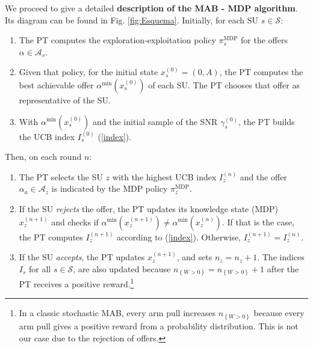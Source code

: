 We proceed to give a detailed \textbf{description of the MAB - MDP algorithm}. Its diagram can be found in Fig. \ref{fig:Esquema}. Initially, for each SU $s \in \mathcal{S}$:
\begin{enumerate}
\item The PT computes the exploration-exploitation policy $\pi_s^{\text{MDP}}$ for the offers $\alpha \in \mathcal{A}_s$. 
\item Given that policy, for the initial state $x_s^{(0)} = (0,A)$, the PT computes the best achievable offer $\alpha^{\text{min}}(x_s^{(0)})$ of each SU. The PT chooses that offer as representative of the SU. 
\item With $\alpha^{\text{min}}(x_s^{(0)})$ and the initial sample of the SNR $\gamma^{(0)}_s$,
the PT builds the UCB index $I_{s}^{(0)}$ (\ref{index}).
\setcounter{enumTemp}{\theenumi}
\end{enumerate}
Then, on each round $n$:
\begin{enumerate}
\setcounter{enumi}{\theenumTemp}
\item The PT selects the SU $z$ with the highest UCB index $I_{z}^{(n)}$ and the offer $\alpha_a \in \mathcal{A}_z$ is indicated by the MDP policy $\pi_z^{\text{MDP}}$.
\item If the SU \textit{rejects} the offer, the PT updates its knowledge state (MDP) $x_z^{(n+1)}$ and checks if $\alpha^{\text{min}}(x_z^{(n+1)}) \neq \alpha^{\text{min}}(x_z^{(n)})$. If that is the case, the PT computes $I_{z}^{(n+1)}$ according to (\ref{index}). Otherwise, $I_{z}^{(n+1)} = I_{z}^{(n)}$.
\item If the SU \textit{accepts}, the PT updates $x_z^{(n+1)}$, and sets $n_z =n_z+1$. The indices $I_{s}$ for all $s\in\mathcal{S}$, are also updated because $n_{\left\{W>0\right\}}  = n_{\left\{W>0\right\}}+1$ after the PT receives a positive reward.\footnote{In a classic stochastic MAB, every arm pull increases $n_{\left\{W>0\right\}}$  because every arm pull gives a positive reward from a probability distribution. This is not our case due to the rejection of offers.}
\end{enumerate}

